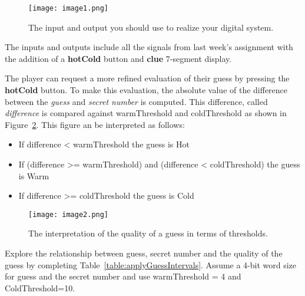 \begin{figure}[ht]
\texttt{[image:  image1.png]}
\caption{The input and output you should use to realize your digital system.}
\label{fig:iOonDevBorad}
\end{figure}

The inputs and outputs include all the signals from last week's assignment
with the addition of a \textbf{hotCold} button and \textbf{clue} 7-segment
display.

The player can request a more refined evaluation of their guess by
pressing the \textbf{hotCold} button. To make this evaluation, the
absolute value of the difference between the \emph{guess} and
\emph{secret number} is computed.  This difference, called 
\emph{difference} is compared against warmThreshold
and coldThreshold as shown in Figure~\ref{fig:guessThreshold}.
This figure an be interpreted as follows:

\begin{itemize}
\item
  If difference \textless{} warmThreshold the guess is Hot
\item
  If (difference \textgreater= warmThreshold) and (difference
  \textless{} coldThreshold) the guess is Warm
\item
  If difference \textgreater= coldThreshold the guess is Cold
\end{itemize}

\begin{figure}[ht]
\texttt{[image:  image2.png]}
\caption{The interpretation of the quality of a guess in terms of thresholds.}
\label{fig:guessThreshold}
\end{figure}

 Explore the relationship
between guess, secret number and the quality of the guess by completing
Table~\ref{table:applyGuessIntervals}. Assume a 4-bit word size for guess 
and the secret number and use warmThreshold = 4 and ColdThreshold=10.

